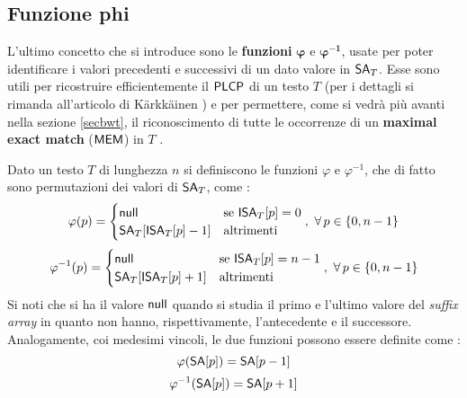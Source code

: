 \subsection{Funzione phi}
L'ultimo concetto che si introduce sono le \textbf{funzioni}
$\boldsymbol\varphi$ e $\mathbf{\boldsymbol\varphi^{-1}}$, usate per poter
identificare i valori precedenti e successivi di 
un dato valore in $\mbox{\rm {\sf SA}}_T$. Esse sono utili per ricostruire
efficientemente il $\mbox{\rm {\sf PLCP}}$ di un testo $T$ (per i dettagli si rimanda
all'articolo di K\"{a}rkk\"{a}inen \cite{plcp}) e per permettere, come si vedrà
più avanti nella sezione \ref{secbwt}, il riconoscimento di tutte le occorrenze
di un \textbf{maximal exact match} ($\mbox{\rm {\sf MEM}}$) in $T$ \cite{phoni}.
\begin{definizione}
  Dato un testo $T$ di lunghezza $n$ si definiscono le funzioni $\varphi$ e
  $\varphi^{-1}$, che di fatto
  sono permutazioni dei valori di $\mbox{\rm {\sf SA}}_T$, come \cite{phoni}: 
  \begin{equation}
    \label{eq:phidef1}
    \varphi(p)=
    \begin{cases}
      \mbox{\rm {\sf null}}&\mbox{se } \mbox{\rm {\sf ISA}}_T[p]=0\\
      \mbox{\rm {\sf SA}}_T[\mbox{\rm {\sf ISA}}_T[p]-1]&\mbox{altrimenti}
    \end{cases},\,\,\forall\, p\in\{0,n-1\}
  \end{equation}
  \begin{equation}
    \label{eq:phiinvdef1}
    \varphi^{-1}(p)=
    \begin{cases}
      \mbox{\rm {\sf null}}&\mbox{se } \mbox{\rm {\sf ISA}}_T[p]=n-1\\
      \mbox{\rm {\sf SA}}_T[\mbox{\rm {\sf ISA}}_T[p]+1]&\mbox{altrimenti}
    \end{cases},\,\,\forall\, p\in\{0,n-1\}
  \end{equation}
  Si noti che si ha il valore $\mbox{\rm {\sf null}}$ quando si studia il
  primo e l'ultimo valore del \textit{suffix array} in quanto non hanno,
  rispettivamente, l'antecedente e il successore.\\
  Analogamente, coi medesimi vincoli, le due funzioni possono essere
  definite come \cite{plcp}: 
  \begin{equation}
    \label{eq:phidef2}
    \varphi(\mbox{\rm {\sf SA}}[p])=\mbox{\rm {\sf SA}}[p-1]
  \end{equation}
  \begin{equation}
    \label{eq:phiinvdef2}
    \varphi^{-1}(\mbox{\rm {\sf SA}}[p])=\mbox{\rm {\sf SA}}[p+1]
  \end{equation}

\end{definizione}
